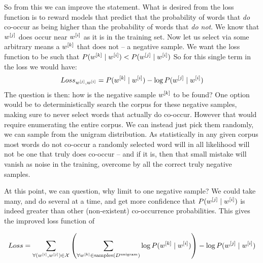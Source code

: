 \documentclass[parskip]{komatufte}
\begin{document}
So from this we can improve the statement.
What is desired from the loss function is to reward models that predict that  the probability of words that \emph{do} co-occur as being higher than the probability of words that \emph{do not}.
We know that $\n w_j$ does occur near $\n w_i$ as it is in the training set.
Now let us select via some arbitrary means a $\n w_k$ that does not -- a negative sample.
We want the loss function to be such that $P(\n w_k\mid \n w_i) < P(\n w_j\mid \n w_i)$
So for this single term in the loss we would have:
\begin{equation}
Loss_{\n w_j,\n w_i} =  P(\n w_k\mid \n w_i) - \log P(\n w_j\mid \n w_i)
\end{equation}
%
%
%
%
The question is then: how is the negative sample $\n w_k$ to be found?
One option would be to deterministically search the corpus for these negative samples, making sure to never select words that actually do co-occur.
However that would require enumerating the entire corpus.
We can instead just pick them randomly, we can sample from the unigram distribution.
As statistically in any given corpus most words do not co-occur 
a randomly selected word will in all likelihood will not be one that truly does co-occur
-- and if it is, then that small mistake will vanish as noise in the training,
overcome by all the correct truly negative samples.


At this point, we can question, why limit to one negative sample?
We could take many, and do several at a time,
and get more confidence that $P(\n w_j\mid \n w_i)$ is indeed greater than other (non-existent) co-occurrence probabilities.
This gives the improved loss function of 

\begin{equation}
Loss = \sum_{\forall (\n w_i,\n w_j)\in \seq{X}} 
\left( \sum_{\forall \n w_k \in \text{samples}(\d D_{unigram})}
 \log P(\n w_k\mid \n w_i) \right) 
 -\log P(\n w_j\mid \n w_i)
\end{equation}
\end{document}
